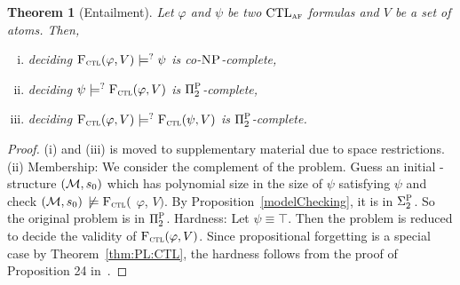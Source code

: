 \documentclass{article}
\newtheorem{theorem}{Theorem}
\begin{document}
\begin{theorem}[Entailment]
	\label{thm:comF}
Let $\varphi$ and $\psi$ be two $\textrm{CTL}_{\textsc{a} \textsc{f}}$ formulas and $V$ be a set of atoms. Then,
\begin{enumerate}[(i)]
  \item deciding  ${\textsc{F}_{\textsc{ctl}}}(\varphi, V ) \models^? \psi$ is co-$\textsc{NP}$-complete,
  \item deciding  $\psi \models^? {\textsc{F}_{\textsc{ctl}}}(\varphi, V)$ is $\Pi_2^{\textsc{P}}$-complete,
  \item deciding ${\textsc{F}_{\textsc{ctl}}}(\varphi, V) \models^? {\textsc{F}_{\textsc{ctl}}}(\psi, V)$ is $\Pi_2^{\textsc{P}}$-complete.
\end{enumerate}
\end{theorem}

\begin{proof}
(i) and (iii) is moved to supplementary material due to space restrictions.
(ii) Membership: We consider the complement of the
 problem. Guess an initial \MPK-structure $({\cal M}, s_0)$ which has  polynomial size in the size of $\psi$ satisfying $\psi$ and check $({\cal M},s_0)$ $\not \models {\textsc{F}_{\textsc{ctl}}}($ $\varphi$, $V)$. By Proposition~\ref{modelChecking}, it is in $\Sigma_2^{\textsc{P}}$. So the original problem is in $\Pi_2^{\textsc{P}}$. Hardness: Let $\psi \equiv \top$. Then the problem is reduced to decide the validity of  ${\textsc{F}_{\textsc{ctl}}}(\varphi, V )$. Since propositional forgetting is a special case by Theorem~\ref{thm:PL:CTL}, the hardness  follows from the proof of Proposition 24 in~\cite{DBLP:journals/jair/LangLM03}.
\end{proof}

\end{document}
